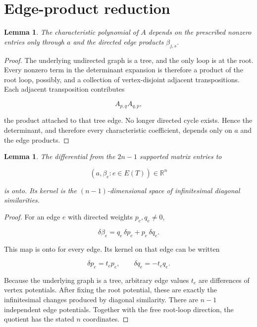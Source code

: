 \documentclass[11pt]{article}
\newtheorem{lemma}[theorem]{Lemma}
\theoremstyle{remark}
\begin{document}
\section{Edge-product reduction}

\begin{lemma}

The characteristic polynomial of $A$ depends on the prescribed nonzero entries only through $a$ and the directed edge products $\beta_{j,s}$.
\end{lemma}

\begin{proof}

The underlying undirected graph is a tree, and the only loop is at the root. Every nonzero term in the determinant expansion is therefore a product of the root loop, possibly, and a collection of vertex-disjoint adjacent transpositions. Each adjacent transposition contributes

\[
A_{p,q}A_{q,p},
\]

the product attached to that tree edge. No longer directed cycle exists. Hence the determinant, and therefore every characteristic coefficient, depends only on $a$ and the edge products.
\end{proof}

\begin{lemma}

The differential from the $2n-1$ supported matrix entries to

\[
(a,\beta_e:e\in E(T))\in\mathbb R^n
\]

is onto. Its kernel is the $(n-1)$-dimensional space of infinitesimal diagonal similarities.
\end{lemma}

\begin{proof}

For an edge $e$ with directed weights $p_e,q_e\ne0$,

\[
\delta\beta_e=q_e\,\delta p_e+p_e\,\delta q_e.
\]

This map is onto for every edge. Its kernel on that edge can be written

\[
\delta p_e=t_ep_e,
\qquad
\delta q_e=-t_eq_e.
\]

Because the underlying graph is a tree, arbitrary edge values $t_e$ are differences of vertex potentials. After fixing the root potential, these are exactly the infinitesimal changes produced by diagonal similarity. There are $n-1$ independent edge potentials. Together with the free root-loop direction, the quotient has the stated $n$ coordinates.
\end{proof}
\end{document}
